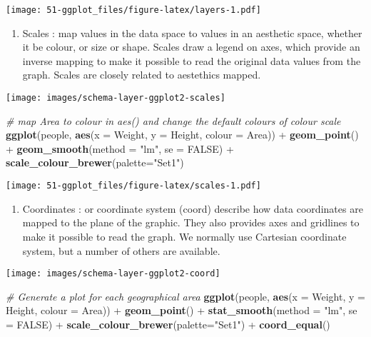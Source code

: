 \documentclass[]{book}
\newenvironment{Shaded}{\begin{snugshade}}{\end{snugshade}}
\newcommand{\KeywordTok}[1]{\textcolor[rgb]{0.13,0.29,0.53}{\textbf{{#1}}}}
\newcommand{\DataTypeTok}[1]{\textcolor[rgb]{0.13,0.29,0.53}{{#1}}}
\newcommand{\StringTok}[1]{\textcolor[rgb]{0.31,0.60,0.02}{{#1}}}
\newcommand{\CommentTok}[1]{\textcolor[rgb]{0.56,0.35,0.01}{\textit{{#1}}}}
\newcommand{\OtherTok}[1]{\textcolor[rgb]{0.56,0.35,0.01}{{#1}}}
\newcommand{\NormalTok}[1]{{#1}}
\providecommand{\tightlist}{%
  \setlength{\itemsep}{0pt}\setlength{\parskip}{0pt}}
\def\tightlist{}
\begin{document}
\texttt{[image: 51-ggplot\_files/figure-latex/layers-1.pdf]}

\begin{enumerate}
\def\labelenumi{\arabic{enumi}.}
\setcounter{enumi}{3}
\tightlist
\item
   {Scales} : map values in the data space to values in an aesthetic
  space, whether it be colour, or size or shape. Scales draw a legend on
  axes, which provide an inverse mapping to make it possible to read the
  original data values from the graph. Scales are closely related to
  aestethics mapped.
\end{enumerate}

\texttt{[image: images/schema-layer-ggplot2-scales]}

\begin{Shaded}
\begin{Highlighting}[]
\CommentTok{# map Area to colour in aes() and change the default colours of colour scale  }
\KeywordTok{ggplot}\NormalTok{(people, }\KeywordTok{aes}\NormalTok{(}\DataTypeTok{x =} \NormalTok{Weight, }\DataTypeTok{y =} \NormalTok{Height, }\DataTypeTok{colour =} \NormalTok{Area)) +}
\StringTok{  }\KeywordTok{geom_point}\NormalTok{() +}
\StringTok{  }\KeywordTok{geom_smooth}\NormalTok{(}\DataTypeTok{method =} \StringTok{"lm"}\NormalTok{, }\DataTypeTok{se =} \OtherTok{FALSE}\NormalTok{) +}
\StringTok{  }\KeywordTok{scale_colour_brewer}\NormalTok{(}\DataTypeTok{palette=}\StringTok{"Set1"}\NormalTok{)}
\end{Highlighting}
\end{Shaded}

\texttt{[image: 51-ggplot\_files/figure-latex/scales-1.pdf]}

\begin{enumerate}
\def\labelenumi{\arabic{enumi}.}
\setcounter{enumi}{4}
\tightlist
\item
   {Coordinates} : or coordinate system (coord) describe how data
  coordinates are mapped to the plane of the graphic. They also provides
  axes and gridlines to make it possible to read the graph. We normally
  use Cartesian coordinate system, but a number of others are available.
\end{enumerate}

\texttt{[image: images/schema-layer-ggplot2-coord]}

\begin{Shaded}
\begin{Highlighting}[]
\CommentTok{# Generate a plot for each geographical area}
\KeywordTok{ggplot}\NormalTok{(people, }\KeywordTok{aes}\NormalTok{(}\DataTypeTok{x =} \NormalTok{Weight, }\DataTypeTok{y =} \NormalTok{Height, }\DataTypeTok{colour =} \NormalTok{Area)) +}
\StringTok{  }\KeywordTok{geom_point}\NormalTok{() +}
\StringTok{  }\KeywordTok{stat_smooth}\NormalTok{(}\DataTypeTok{method =} \StringTok{"lm"}\NormalTok{, }\DataTypeTok{se =} \OtherTok{FALSE}\NormalTok{) +}\StringTok{ }
\StringTok{  }\KeywordTok{scale_colour_brewer}\NormalTok{(}\DataTypeTok{palette=}\StringTok{"Set1"}\NormalTok{) +}
\StringTok{  }\KeywordTok{coord_equal}\NormalTok{() }
\end{Highlighting}
\end{Shaded}
\end{document}
